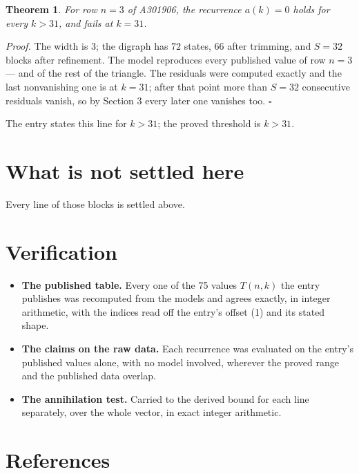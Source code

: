 \documentclass[11pt]{article}
\newtheorem{theorem}{Theorem}
\theoremstyle{definition}
\begin{document}
\begin{theorem} For row $n = 3$ of A301906, the recurrence $a(k) = 0$ holds for every $k > 31$, and fails at $k = 31$.\end{theorem}

{\itshape Proof.} The width is $3$; the digraph has $72$ states, $66$ after trimming, and $S = 32$ blocks after refinement. The model reproduces every published value of row $n = 3$ --- and of the rest of the triangle. The residuals were computed exactly and the last nonvanishing one is at $k = 31$; after that point more than $S = 32$ consecutive residuals vanish, so by Section 3 every later one vanishes too. $\square$

The entry states this line for $k > 31$; the proved threshold is $k > 31$.

\section{What is not settled here}

Every line of those blocks is settled above.

\section{Verification}

\begin{itemize}

\item {\bfseries The published table.} Every one of the 75 values $T(n,k)$ the entry publishes was recomputed from the models and agrees exactly, in integer arithmetic, with the indices read off the entry's offset (1) and its stated shape.

\item {\bfseries The claims on the raw data.} Each recurrence was evaluated on the entry's published values alone, with no model involved, wherever the proved range and the published data overlap.

\item {\bfseries The annihilation test.} Carried to the derived bound for each line separately, over the whole vector, in exact integer arithmetic.

\end{itemize}

\section{References}
\end{document}
